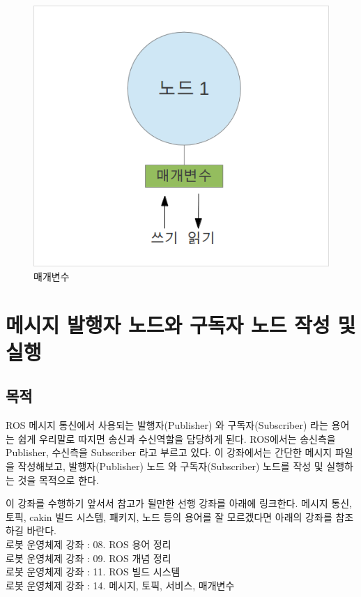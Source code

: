 \begin{figure}[h]
\centering\includegraphics[width=0.5\columnwidth]{pictures/chapter7/msgtrans4.png}
\caption{매개변수}
\end{figure}

\section{메시지 발행자 노드와 구독자 노드 작성 및 실행}

\subsection{목적}

ROS 메시지 통신에서 사용되는 발행자(Publisher) 와 구독자(Subscriber) 라는 용어는 쉽게 우리말로 따지면 송신과 수신역할을 담당하게 된다. ROS에서는 송신측을 Publisher, 수신측을 Subscriber 라고 부르고 있다. 이 강좌에서는 간단한 메시지 파일을 작성해보고, 발행자(Publisher) 노드 와 구독자(Subscriber) 노드를 작성 및 실행하는 것을 목적으로 한다.

이 강좌를 수행하기 앞서서 참고가 될만한 선행 강좌를 아래에 링크한다. 메시지 통신, 토픽, cakin 빌드 시스템, 패키지, 노드 등의 용어를 잘 모르겠다면 아래의 강좌를 참조하길 바란다.\\

로봇 운영체제 강좌 : 08. ROS 용어 정리\\
로봇 운영체제 강좌 : 09. ROS 개념 정리\\
로봇 운영체제 강좌 : 11. ROS 빌드 시스템\\
로봇 운영체제 강좌 : 14. 메시지, 토픽, 서비스, 매개변수\\

